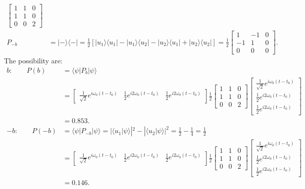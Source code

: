 \documentclass[letterpaper,11pt,twoside]{article}
\newcommand{\ket}[1]{|#1\rangle}
\newcommand{\bra}[1]{\langle#1|}
\newcommand{\braket}[1]{\langle#1\rangle}
\begin{document}
\begin{enumerate}[itemsep=0pt,topsep=0pt,label=\alph*.]
\begin{align*}
\begin{bmatrix}
      1&1&0\\1&1&0\\0&0&2
    \end{bmatrix}\\
    P_{-b}&=\ket{-}\bra{-}=\frac{1}{2}[\ket{u_1}\bra{u_1}-\ket{u_1}\bra{u_2}-\ket{u_2}\bra{u_1}+\ket{u_2}\bra{u_2}]=\frac{1}{2}\begin{bmatrix}
      1&-1&0\\-1&1&0\\0&0&0
    \end{bmatrix}.
  \end{align*}
  The possibility are:
  \begin{align*}
    b:\qquad P(b)&=\braket{\psi|P_b|\psi}\\&=\begin{bmatrix}
      \frac{1}{\sqrt{2}}e^{i\omega_0(t-t_0)}&\frac{1}{2}e^{i2\omega_0(t-t_0)}&\frac{1}{2}e^{i2\omega_0(t-t_0)}
    \end{bmatrix}\frac{1}{2}\begin{bmatrix}
      1&1&0\\1&1&0\\0&0&2
    \end{bmatrix}\begin{bmatrix}
      \frac{1}{\sqrt{2}}e^{i\omega_0(t-t_0)}\\\frac{1}{2}e^{i2\omega_0(t-t_0)}\\\frac{1}{2}e^{i2\omega_0(t-t_0)}
    \end{bmatrix}\\
    &=0.853.\\
    -b:\qquad P(-b)&=\braket{\psi|P_{-b}|\psi}=|\braket{u_1|\psi}|^2-|\braket{u_2|\psi}|^2=\frac{1}{2}-\frac{1}{4}=\frac{1}{2}\\
    &=\begin{bmatrix}
      \frac{1}{\sqrt{2}}e^{i\omega_0(t-t_0)}&\frac{1}{2}e^{i2\omega_0(t-t_0)}&\frac{1}{2}e^{i2\omega_0(t-t_0)}
    \end{bmatrix}\frac{1}{2}\begin{bmatrix}
      1&1&0\\1&1&0\\0&0&2
    \end{bmatrix}\begin{bmatrix}
      \frac{1}{\sqrt{2}}e^{i\omega_0(t-t_0)}\\\frac{1}{2}e^{i2\omega_0(t-t_0)}\\\frac{1}{2}e^{i2\omega_0(t-t_0)}
    \end{bmatrix}\\
    &=0.146.
  \end{align*}

  
\end{enumerate}
\end{document}
